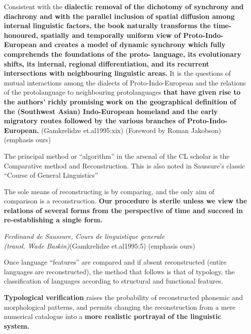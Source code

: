 \begin{myquote}
Consistent with the \textbf{dialectic removal of the dichotomy of synchrony and diachrony and with the parallel inclusion of spatial diffusion among internal linguistic factors, the book naturally transforms the time-honoured, spatially and temporally uniform view of Proto-Indo-European and creates a model of dynamic synchrony which fully comprehends the foundations of the proto- language, its evolutionary shifts, its internal, regional differentiation, and its recurrent intersections with neighbouring linguistic areas.} It is the questions of mutual interactions among the dialects of Proto-Indo-European and the relations of the protolanguage to neighbouring protolanguages \textbf{that have given rise to the authors' richly promising work on the geographical definition of the (Southwest Asian) Indo-European homeland and the early migratory routes followed by the various branches of Proto-Indo-European.} (Gamkrelidze et.al1995:xix) (Foreword by Roman Jakobson) (emphasis ours)
\end{myquote}

The principal method or “algorithm” in the arsenal of the CL scholar is the Comparative method and Reconstruction. This is also noted in Saussure’s classic “Course of General Linguistics”

\begin{myquote}
The sole means of reconstructing is by comparing, and the only aim of comparison is a reconstruction. \textbf{Our procedure is sterile unless we view the relations of several forms from the perspective of time and succeed in re-establishing a single form.}
\end{myquote}

\begin{myquote}
\textit{Ferdinand de Saussure, Cours de linguistique generale}\\\textit{(transl. Wade Baskin)}(Gamkrelidze et.al1995:5) (emphasis ours)
\end{myquote}

Once language “features” are compared and if absent reconstructed (entire languages are reconstructed), the method that follows is that of typology, the classification of languages according to structural and functional features.

\begin{myquote}
\textbf{Typological verification} raises the probability of reconstructed phonemic and morphological patterns, and permits changing the reconstruction from a mere numerical catalogue into a \textbf{more realistic portrayal of the linguistic system.}
\end{myquote}

